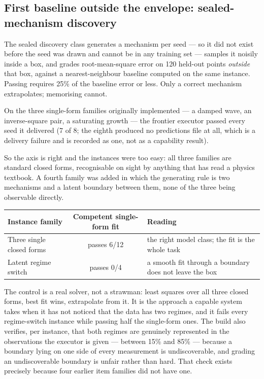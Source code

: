 \documentclass[11pt]{article}
\theoremstyle{definition}
\begin{document}
\subsection{First baseline outside the envelope: sealed-mechanism discovery}\label{sec:discovery}

The sealed discovery class generates a mechanism per seed --- so it did not exist before the seed was drawn and cannot be in any training set --- samples it noisily inside a box, and grades root-mean-square error on 120 held-out points \emph{outside} that box, against a nearest-neighbour baseline computed on the same instance. Passing requires 25\% of the baseline error or less. Only a correct mechanism extrapolates; memorising cannot.

On the three single-form families originally implemented --- a damped wave, an inverse-square pair, a saturating growth --- the frontier executor passed every seed it delivered (7 of 8; the eighth produced no predictions file at all, which is a delivery failure and is recorded as one, not as a capability result).

So the axis is right and the instances were too easy: all three families are standard closed forms, recognisable on sight by anything that has read a physics textbook. A fourth family was added in which the generating rule is two mechanisms and a latent boundary between them, none of the three being observable directly.

\begin{table}[h]
\centering\small
\begin{tabularx}{\textwidth}{@{}lcY@{}}
\toprule
Instance family & Competent single-form fit & Reading \\
\midrule
Three single closed forms & passes 6/12 & the right model class; the fit is the whole task \\
Latent regime switch & passes 0/4 & a smooth fit through a boundary does not leave the box \\
\bottomrule
\end{tabularx}
\end{table}

The control is a real solver, not a strawman: least squares over all three closed forms, best fit wins, extrapolate from it. It is the approach a capable system takes when it has not noticed that the data has two regimes, and it fails every regime-switch instance while passing half the single-form ones. The build also verifies, per instance, that both regimes are genuinely represented in the observations the executor is given --- between 15\% and 85\% --- because a boundary lying on one side of every measurement is undiscoverable, and grading an undiscoverable boundary is unfair rather than hard. That check exists precisely because four earlier item families did not have one.
\end{document}
